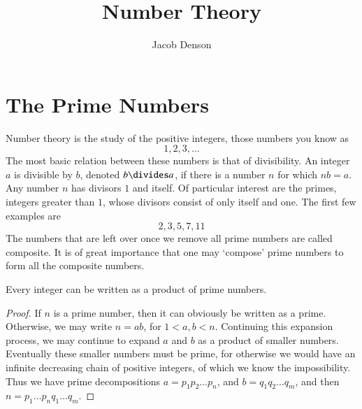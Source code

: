 

\DeclareMathOperator{\Dom}{Dom}

\title{Number Theory}
\author{Jacob Denson}




\maketitle

\tableofcontents


\chapter{The Prime Numbers}

Number theory is the study of the positive integers, those numbers you know as
%
\[ 1,2,3,\dots \]
%
The most basic relation between these numbers is that of divisibility. An integer $a$ is divisible by $b$, denoted $b \divides a$, if there is a number $n$ for which $nb = a$. Any number $n$ has divisors $1$ and itself. Of particular interest are the primes, integers greater than $1$, whose divisors consist of only itself and one. The first few examples are
%
\[ 2,3,5,7,11 \]
%
The numbers that are left over once we remove all prime numbers are called composite. It is of great importance that one may `compose' prime numbers to form all the composite numbers.

\begin{theorem}
    Every integer can be written as a product of prime numbers.
\end{theorem}
\begin{proof}
    If $n$ is a prime number, then it can obviously be written as a prime. Otherwise, we may write $n = ab$, for $1 < a,b < n$. Continuing this expansion process, we may continue to expand $a$ and $b$ as a product of smaller numbers. Eventually these smaller numbers must be prime, for otherwise we would have an infinite decreasing chain of positive integers, of which we know the impossibility. Thus we have prime decompositions $a = p_1 p_2 \dots p_n$, and $b = q_1 q_2 \dots q_m$, and then $n = p_1 \dots p_n q_1 \dots q_m$.
\end{proof}

